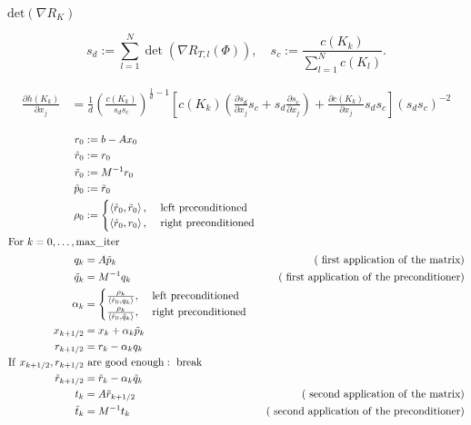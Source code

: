 \documentclass{article}
\begin{document}
$ \mathrm{det}(\nabla R_K)$
\pagebreak

\[
  s_d := \sum_{l=1}^N \det(\nabla R_{T,l}(\Phi)), \quad s_c :=  \frac{c (K_k)}{\sum_{l=1}^N c(K_l)}.
\]
\pagebreak

\begin{align*}
  \frac{\partial h(K_k)}{\partial x_j} & = \frac{1}{d} \left( \frac{c(K_k)}{s_d s_c} \right)^
  {\frac{1}{d}-1} \left[ c(K_k) ( \frac{\partial s_d}{\partial x_j} s_c + s_d
  \frac{\partial s_c}{\partial x_j} ) + \frac{\partial c(K_k)}{\partial x_j} s_d s_c \right]
  (s_d s_c)^{-2}
\end{align*}
\pagebreak

\begin{align*}
  r_0 & := b - A x_0 \\
  \hat{r}_0 & := r_0 \\
  \tilde{r}_0 & := M^{-1} r_0 \\
  \tilde{p}_0 & := \tilde{r}_0 \\
  \rho_0 & :=
  \begin{cases}
    \left< \hat{r}_0, \tilde{r}_0 \right>, & \mathrm{~left~preconditioned} \\
    \left< \hat{r}_0, r_0 \right>, & \mathrm{~right~preconditioned}
  \end{cases}\\
  \intertext{For $k = 0, \dots, \mathrm{max\_iter}$}
  q_k & = A \tilde{p}_k & \mathrm{(~first~application~of~the~matrix)}\\
  \tilde{q}_k & = M^{-1} q_k &\mathrm{(~first~application~of~the~preconditioner)}\\
  \alpha_k & =
  \begin{cases}
    \frac{\rho_k}{\left< \hat{r}_0, q_k \right>}, & \mathrm{~left~preconditioned} \\
    \frac{\rho_k}{\left< \hat{r}_0, \tilde{q}_k \right>}, & \mathrm{~right~preconditioned} \\
  \end{cases}\\
  x_{k+1/2} & = x_k + \alpha_k \tilde{p}_k\\
  r_{k+1/2} & = r_k - \alpha_k q_k \\
  \mathrm{If~} x_{k+1/2}, r_{k+1/2}& \mathrm{~are~good~enough:~break}\\
  \tilde{r}_{k+1/2} & = \tilde{r}_k - \alpha_k \tilde{q}_k \\
  t_k & = A \tilde{r}_{k+1/2} & \mathrm{(~second~application~of~the~matrix)}\\
  \tilde{t}_k & = M^{-1} t_k & \mathrm{(~second~application~of~the~preconditioner)}\\

\end{align*}
\end{document}
